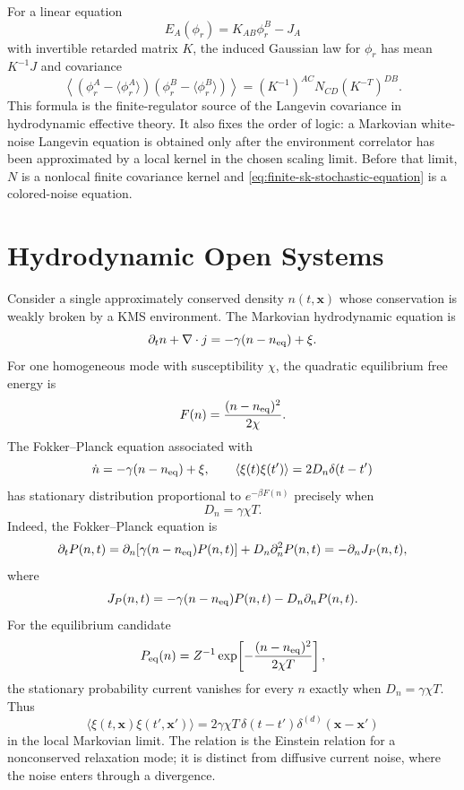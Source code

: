 For a linear equation
\[
  E_A(\phi_r)=K_{AB}\phi_r^B-J_A
\]
with invertible retarded matrix \(K\), the induced Gaussian law for
\(\phi_r\) has mean \(K^{-1}J\) and covariance
\begin{equation}
  \left\langle
    (\phi_r^A-\langle\phi_r^A\rangle)
    (\phi_r^B-\langle\phi_r^B\rangle)
  \right\rangle
  =
  (K^{-1})^{AC}N_{CD}(K^{-T})^{DB}.
  \label{eq:finite-sk-linear-noise-covariance}
\end{equation}
This formula is the finite-regulator source of the Langevin covariance in
hydrodynamic effective theory.  It also fixes the order of logic: a Markovian
white-noise Langevin equation is obtained only after the environment
correlator has been approximated by a local kernel in the chosen scaling
limit.  Before that limit, \(N\) is a nonlocal finite covariance kernel and
\eqref{eq:finite-sk-stochastic-equation} is a colored-noise equation.

\section{Hydrodynamic Open Systems}

Consider a single approximately conserved density \(n(t,\mathbf x)\) whose
conservation is weakly broken by a KMS environment.  The Markovian
hydrodynamic equation is
\begin{equation}
  \partial_t n+\nabla\cdot j
  =
  -\gamma(n-n_{\rm eq})+\xi .
  \label{eq:open-system-hydro-relaxation}
\end{equation}
For one homogeneous mode with susceptibility \(\chi\), the quadratic
equilibrium free energy is
\[
  F(n)=\frac{(n-n_{\rm eq})^2}{2\chi}.
\]
The Fokker--Planck equation associated with
\[
  \dot n=-\gamma(n-n_{\rm eq})+\xi,
  \qquad
  \langle\xi(t)\xi(t')\rangle=2D_n\delta(t-t')
\]
has stationary distribution proportional to \(e^{-\beta F(n)}\) precisely
when
\begin{equation}
  D_n=\gamma\chi T .
  \label{eq:open-system-einstein-noise}
\end{equation}
Indeed, the Fokker--Planck equation is
\[
  \partial_tP(n,t)
  =
  \partial_n\!\left[\gamma(n-n_{\rm eq})P(n,t)\right]
  +D_n\partial_n^2P(n,t)
  =
  -\partial_nJ_P(n,t),
\]
where
\[
  J_P(n,t)=
  -\gamma(n-n_{\rm eq})P(n,t)-D_n\partial_nP(n,t).
\]
For the equilibrium candidate
\[
  P_{\rm eq}(n)=
  Z^{-1}\exp\!\left[-\frac{(n-n_{\rm eq})^2}{2\chi T}\right],
\]
the stationary probability current vanishes for every \(n\) exactly when
\(D_n=\gamma\chi T\).
Thus
\begin{equation}
  \langle\xi(t,\mathbf x)\xi(t',\mathbf x')\rangle
  =
  2\gamma\chi T\,
  \delta(t-t')\delta^{(d)}(\mathbf x-\mathbf x')
  \label{eq:open-system-hydro-noise}
\end{equation}
in the local Markovian limit.  The relation is the Einstein relation for a
nonconserved relaxation mode; it is distinct from diffusive current noise,
where the noise enters through a divergence.

